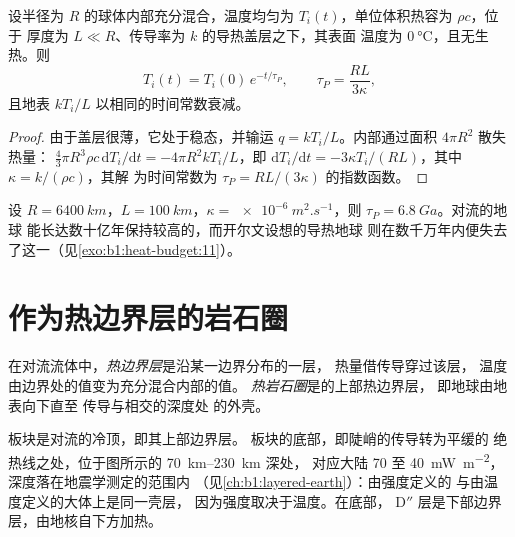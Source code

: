 \begin{proposition}[佩里的充分混合地球]\label{prop:b1:heat-budget:perry}
设半径为 $R$ 的球体内部充分混合，温度均匀为
$T_i(t)$，单位体积热容为 $\rho c$，位于
厚度为 $L \ll R$、传导率为 $k$ 的导热盖层之下，其表面
温度为 $\qty{0}{\degreeCelsius}$，且无生热。则
\[
  T_i(t) = T_i(0)\,e^{-t/\tau_P}, \qquad \tau_P = \frac{RL}{3\kappa},
\]
且地表 $kT_i/L$ 以相同的时间常数衰减。
\end{proposition}

\begin{proof}
由于盖层很薄，它处于稳态，并输运
$q = kT_i/L$。内部通过面积 $4\pi R^2$ 散失热量：
$\tfrac43\pi R^3\rho c\,\mathrm dT_i/\mathrm dt = -4\pi R^2 kT_i/L$，即
$\mathrm dT_i/\mathrm dt = -3\kappa T_i/(RL)$，其中 $\kappa = k/(\rho c)$，其解
为时间常数为 $\tau_P = RL/(3\kappa)$ 的指数函数。
\end{proof}

设 $R = \qty{6400}{km}$，$L = \qty{100}{km}$，$\kappa =
\qty{e-6}{m^2.s^{-1}}$，则 $\tau_P = \qty{6.8}{Ga}$。对流的地球
能长达数十亿年保持较高的，而开尔文设想的导热地球
则在数千万年内便失去了这一（见\cref{exo:b1:heat-budget:11}）。

\section{作为热边界层的岩石圈}\label{sec:b1:heat-budget:boundary-layer}

\begin{definition}\label{def:b1:heat-budget:boundary-layer}
在对流流体中，\emph{热边界层}是沿某一边界分布的一层，
热量借传导穿过该层，
温度由边界处的值变为充分混合内部的值。
\emph{热岩石圈}是的上部热边界层，
即地球由地表向下直至
传导与相交的深度处
的外壳。
\end{definition}

板块是对流的冷顶，即其上部边界层。
板块的底部，即陡峭的传导转为平缓的
绝热线之处，位于图所示的 \qtyrange{70}{230}{km} 深处，
对应大陆 70 至 \qty{40}{mW.m^{-2}}，深度落在地震学测定的范围内
（见\cref{ch:b1:layered-earth}）：由强度定义的
与由温度定义的大体上是同一壳层，
因为强度取决于温度。在底部，
D$''$ 层是下部边界层，由地核自下方加热。

